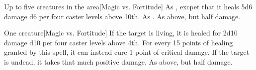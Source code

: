 \begin{spellheader}
    \spellrng{\rngclose}
\end{spellheader}
\begin{spelleffects}
    \begin{spelltargets}{Up to five creatures in the area}[Magic vs. Fortitude]
        \spelleffect As , excpet that it heals 5d6 damage \add d6 per four caster levels above 10th.
        \spellsuccess As .
        \spellfailure As above, but half damage.
    \end{spelltargets}
\end{spelleffects}
\begin{spellfooter}
    
\end{spellfooter}

\begin{spellheader}
    \spellrng{\rngclose}
\end{spellheader}
\begin{spelleffects}
    \begin{spelltarget}{One creature}[Magic vs. Fortitude]
        \spelleffect If the target is living, it is healed for 2d10 damage \add d10 per four caster levels above 4th. For every 15 points of healing granted by this spell, it can instead cure 1 point of critical damage.
        \spellsuccess If the target is undead, it takes that much positive damage.
        \spellfailure As above, but half damage.
    \end{spelltarget}
\end{spelleffects}
\begin{spellfooter}
    
\end{spellfooter}

